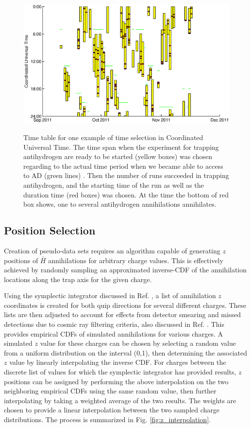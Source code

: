 \documentclass[superscriptaddress,aps,prb,11pt]{revtex4-1}
\begin{document}
\begin{figure}
  \includegraphics[scale=0.6]{eventTime_sim_example.eps}
  \label{fig:eventTime_date_sim}
  \caption{Time table for one example of time selection in Coordinated Universal Time. The time span when the experiment for trapping antihydrogen are ready to be started (yellow boxes) was chosen regarding to the actual time period when we became able to access to AD (green lines) . Then the number of runs succeeded in trapping antihydrogen, and the starting time  of the run as well as the duration time (red boxes) was chosen. At the time the bottom of red box shows, one to several antihydrogen annihilations annihilates.}
\end{figure}



\subsection*{Position Selection}
Creation of pseudo-data sets requires an algorithm capable of generating $z$ positions of $\bar{H}$ annihilations for arbitrary charge values.  This is effectively achieved by randomly sampling an approximated inverse-CDF of the annihilation locations along the trap axis for the given charge.

Using the symplectic integrator discussed in Ref. , a list of annihilation $z$ coordinates is created for both quip directions for several different charges.  These lists are then adjusted to account for effects from detector smearing and missed detections due to cosmic ray filtering criteria, also discussed in Ref. .  This provides empirical CDFs of simulated annihilations for various charges.  A simulated $z$ value for these charges can be chosen by selecting a random value from a uniform distribution on the interval (0,1), then determining the associated $z$ value by linearly interpolating the inverse CDF.  For charges between the discrete list of values for which the symplectic integrator has provided results, $z$ positions can be assigned by performing the above interpolation on the two neighboring empirical CDFs using the same random value, then further interpolating by taking a weighted average of the two results.  The weights are chosen to provide a linear interpolation between the two sampled charge distributions.  The process is summarized in Fig. \ref{fig:z_interpolation}.
\end{document}

